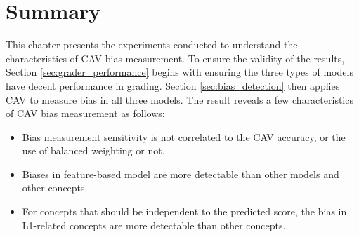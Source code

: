 


\section{Summary}
This chapter presents the experiments conducted to understand the characteristics of CAV bias measurement. To ensure the validity of the results, Section \ref{sec:grader_performance} begins with ensuring the three types of models have decent performance in grading. Section \ref{sec:bias_detection} then applies CAV to measure bias in all three models. The result reveals a few characteristics of CAV bias measurement as follows:

\begin{itemize}
    \item Bias measurement sensitivity is not correlated to the CAV accuracy, or the use of balanced weighting or not.
    \item Biases in feature-based model are more detectable than other models and other concepts.
    \item For concepts that should be independent to the predicted score, the bias in L1-related concepts are more detectable than other concepts.
\end{itemize}


